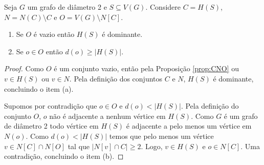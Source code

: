 \begin{proposition}
Seja $G$ um grafo de diâmetro 2 e $S \subseteq V(G)$. Considere $C=H(S)$, $N=N(C) \setminus C$ e $O=V(G) \setminus N[C]$.
\begin{enumerate}[label=(\alph*)]
  \item{Se $O$ é vazio então $H(S)$ é dominante.} 
  \item{Se $o \in O$ então $d(o) \ge |H(S)|$.}
\end{enumerate}
\label{prop-div-conjuntos}
\end{proposition}
\begin{proof}
Como $O$ é um conjunto vazio, então pela Proposição \ref{prop:CNO} ou $v \in H(S)$ ou $v \in N$. Pela definição dos conjuntos $C$ e $N$, $H(S)$ é dominante, concluindo o item (a).

Supomos por contradição que $o\in O$ e $d(o) < |H(S)|$. Pela definição do conjunto $O$, $o$ não é adjacente a nenhum vértice em $H(S)$. Como $G$ é um grafo de diâmetro 2 todo vértice em $H(S)$ é adjacente a pelo menos um vértice em $N(o)$. Como $d(o) < |H(S)|$ temos que pelo menos um vértice $v \in N[C] \cap N[O]$ tal que $|N[v] \cap C| \geq 2$. Logo, $v \in H(S)$ e $o \in N[C]$. Uma contradição, concluindo o item (b).
\end{proof}



